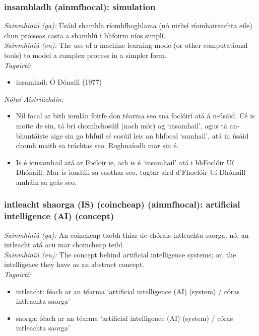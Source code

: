 \subsubsection*{insamhladh (ainmfhocal): simulation}
 \noindent \textit{Sainmhíniú (ga):} Úsáid shamhla ríomhfhoghlama (nó uirlisí ríomhaireachta eile) chun próiseas casta a shamhlú i bhfoirm níos simplí.
\\
 \noindent \textit{Sainmhíniú (en):} The use of a machine learning mode (or other computational tools) to model a complex process in a simpler form.
\\
 \noindent \textit{Tagairtí:}
\begin{itemize}
	\item insamhail: Ó Dónaill (1977) \cite{odonaill}
\end{itemize}

 \noindent \textit{Nótaí Aistriúcháin:}
\begin{itemize}
	\item Níl focal ar bith iomlán foirfe don téarma seo sna foclóirí atá á n-úsáid. Cé is moite de sin, tá brí chomhchosúil (nach mór) ag `insamhail', agus tá an-bhuntáiste aige sin go bhfuil sé cosúil leis an bhfocal `samhail', atá in úsáid chomh maith sa tráchtas seo. Roghnaíodh mar sin é.
	\item Is é ionsamhail atá ar Focloir.ie, ach is é `insamhail' atá i bhFoclóir Uí Dhónaill. Mar is iondúil sa saothar seo, tugtar aird d'Fhoclóir Uí Dhónaill amháin sa gcás seo.
\end{itemize}


\subsubsection*{intleacht shaorga (IS) (coincheap) (ainmfhocal): artificial intelligence (AI) (concept)}
 \noindent \textit{Sainmhíniú (ga):} An coincheap taobh thiar de chórais intleachta saorga; nó, an intleacht atá acu mar choincheap teibí.
\\
 \noindent \textit{Sainmhíniú (en):} The concept behind artificial intelligence systems; or, the intelligence they have as an abstract concept.
\\
 \noindent \textit{Tagairtí:}
\begin{itemize}
	\item intleacht: féach ar an téarma `artificial intelligence (AI) (system) / córas intleachta saorga'
	\item saorga: féach ar an téarma `artificial intelligence (AI) (system) / córas intleachta saorga'
\end{itemize}

